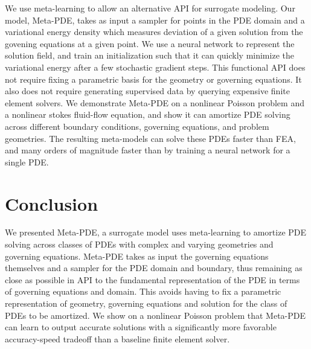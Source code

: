 \documentclass{puthesis}
\begin{document}
We use meta-learning to allow an alternative API for surrogate modeling.
Our model, Meta-PDE, takes as input a sampler for points in the PDE domain and
a variational energy density which measures deviation of a
given solution from the govening equations at a given point.
We use a neural network to represent the solution field, and train an initialization such that
it can quickly minimize the variational energy after a few stochastic gradient steps.
This functional API does not require fixing a parametric basis for the geometry or
governing equations.
It also does not require generating supervised data by
querying expensive finite element solvers.
We demonstrate Meta-PDE on a nonlinear Poisson problem and a nonlinear stokes
fluid-flow equation, and show it can amortize PDE solving
across different boundary conditions, governing equations,
and problem geometries.
The resulting meta-models can solve these PDEs faster than FEA,
and many orders of magnitude faster than by
training a neural network for a single PDE.







% 
\section{Conclusion}
We presented Meta-PDE, a surrogate model uses meta-learning to amortize PDE solving
across classes of PDEs with complex and varying geometries and governing equations.
Meta-PDE takes as input the governing equations themselves and a sampler for the
PDE domain and boundary, thus remaining as close as possible in API to the fundamental
representation of the PDE in terms of governing equations and domain.
This avoids having to fix a parametric representation of geometry, governing equations
and solution for the class of PDEs to be amortized.
We show on a nonlinear Poisson problem that Meta-PDE can learn to output accurate
solutions with a significantly more favorable accuracy-speed tradeoff than
a baseline finite element solver.
\end{document}
